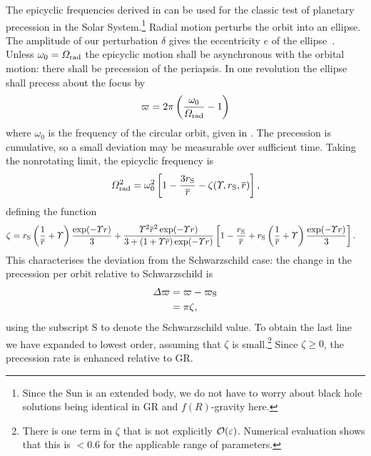 The epicyclic frequencies derived in  can be used for the classic test of planetary precession in the Solar System.\footnote{Since the Sun is an extended body, we do not have to worry about black hole solutions being identical in GR and $f(R)$-gravity here.} Radial motion perturbs the orbit into an ellipse. The amplitude of our perturbation $\delta$ gives the eccentricity $e$ of the ellipse~\cite{Kerner2001a}. Unless $\omega_0 = \Omega_\mathrm{rad}$ the epicyclic motion shall be asynchronous with the orbital motion: there shall be precession of the periapsis. In one revolution the ellipse shall precess about the focus by
\begin{equation}
\varpi = 2\pi\left(\frac{\omega_0}{\Omega_\mathrm{rad}} - 1\right)
\end{equation}
where $\omega_0$ is the frequency of the circular orbit, given in . The precession is cumulative, so a small deviation may be measurable over sufficient time. Taking the nonrotating limit, the epicyclic frequency is
\begin{equation}
\Omega_\mathrm{rad}^2 = \omega_0^2 \left[1 - \frac{3r_\mathrm{S}}{\overline{r}} - \zeta(\Upsilon,r_\mathrm{S},\overline{r})\right],
\end{equation}
defining the function
\begin{align}
\zeta = {} & r_\mathrm{S}\left(\frac{1}{\overline{r}} + \Upsilon\right)\frac{\exp(-\Upsilon r)}{3} + \frac{\Upsilon^2\overline{r}^2\exp(-\Upsilon r)}{3 + (1 + \Upsilon \overline{r})\exp(-\Upsilon r)} \left[1 - \frac{r_\mathrm{S}}{\overline{r}} + r_\mathrm{S}\left(\frac{1}{\overline{r}} + \Upsilon\right)\frac{\exp(-\Upsilon r)}{3}\right].
\end{align}
This characterises the deviation from the Schwarzschild case: the change in the precession per orbit relative to Schwarzschild is
\begin{align}
\Delta \varpi = {} & \varpi - \varpi_\mathrm{S} \\
 = {} & \pi\zeta,
\end{align}
using the subscript $\text{S}$ to denote the Schwarzschild value. To obtain the last line we have expanded to lowest order, assuming that $\zeta$ is small.\footnote{There is one term in $\zeta$ that is not explicitly $\mathcal{O}({\varepsilon})$. Numerical evaluation shows that this is $< 0.6$ for the applicable range of parameters.} Since $\zeta \geq 0$, the precession rate is enhanced relative to GR.

